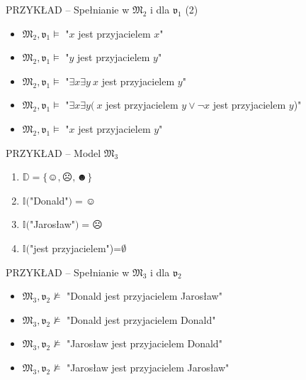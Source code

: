\documentclass{beamer}
\begin{document}
\begin{frame}{PRZYKŁAD -- Spełnianie w $\mathfrak{M}_2$ i dla $\mathfrak{v}_1$ (2)}
%
\begin{itemize}
\item $\mathfrak{M}_2,\mathfrak{v}_1 \vDash$ "$x$ jest przyjacielem $x$"%
\item $\mathfrak{M}_2,\mathfrak{v}_1 \vDash$ "$y$ jest przyjacielem $y$"%
\item $\mathfrak{M}_2,\mathfrak{v}_1 \vDash$ "$\exists x \exists y ~x$ jest przyjacielem $y$"%
\item $\mathfrak{M}_2,\mathfrak{v}_1 \vDash$ "$\exists x \exists y ( ~x$ jest przyjacielem $y \lor \neg x$ jest przyjacielem $y$)"%
\item $\mathfrak{M}_2,\mathfrak{v}_1 \vDash$ "$x$ jest przyjacielem $y$"
\end{itemize}
\end{frame}

\begin{frame}{PRZYKŁAD -- Model $\mathfrak{M}_3$}
%
\begin{enumerate}
    \item $\mathbb{D} = \{\smiley{}, \frownie{}, \blacksmiley{} \}$%
    \item $\mathbb{I}($"Donald"$)=\smiley{}$%
    \item $\mathbb{I}($"Jarosław"$)=\frownie{}$%
    \item $\mathbb{I}($"jest przyjacielem")=$\emptyset$
\end{enumerate}
\end{frame}


\begin{frame}{PRZYKŁAD -- Spełnianie w $\mathfrak{M}_3$ i dla $\mathfrak{v}_2$}
%
\begin{itemize}
\item $\mathfrak{M}_3,\mathfrak{v}_2 \not \vDash$ "Donald jest przyjacielem Jarosław"%
\item $\mathfrak{M}_3,\mathfrak{v}_2 \not \vDash$ "Donald jest przyjacielem Donald"%
\item $\mathfrak{M}_3,\mathfrak{v}_2 \not \vDash$ "Jarosław jest przyjacielem Donald"%
\item $\mathfrak{M}_3,\mathfrak{v}_2 \not \vDash$ "Jarosław jest przyjacielem Jarosław"
\end{itemize}
\end{frame}
\end{document}
